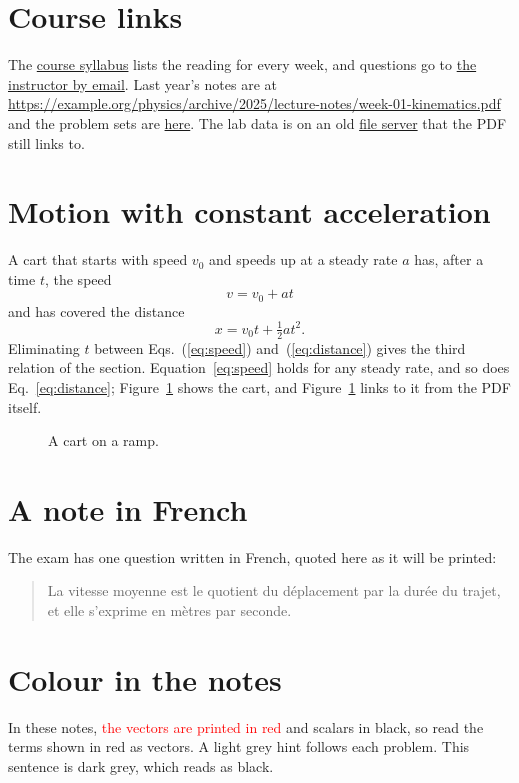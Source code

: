\documentclass[11pt]{article}
\begin{document}
\section{Course links}

The \href{https://example.org/physics/syllabus}{course syllabus} lists the reading for
every week, and questions go to
\href{mailto:instructor@example.edu}{the instructor by email}. Last year's notes are at
\url{https://example.org/physics/archive/2025/lecture-notes/week-01-kinematics.pdf} and
the problem sets are \href{https://example.org/physics/problems}{here}. The lab data is
on an old \href{ftp://ftp.example.org/lab/data.csv}{file server} that the PDF still
links to.

\section{Motion with constant acceleration}

A cart that starts with speed $v_0$ and speeds up at a steady rate $a$ has, after a time
$t$, the speed
\begin{equation}
  v = v_0 + a t
  \label{eq:speed}
\end{equation}
and has covered the distance
\begin{equation}
  x = v_0 t + \tfrac{1}{2} a t^2 .
  \label{eq:distance}
\end{equation}
Eliminating $t$ between Eqs.~(\ref*{eq:speed}) and~(\ref*{eq:distance}) gives the third
relation of the section. Equation~\eqref{eq:speed} holds for any steady rate, and so does
Eq.~\ref*{eq:distance}; Figure~\ref*{fig:cart} shows the cart, and
Figure~\ref{fig:cart} links to it from the PDF itself.

\begin{figure}[h]
  \centering
  \caption{A cart on a ramp.}
  \label{fig:cart}
\end{figure}

\section{A note in French}

The exam has one question written in French, quoted here as it will be printed:
\begin{quote}
La vitesse moyenne est le quotient du d\'eplacement par la dur\'ee du trajet, et elle
s'exprime en m\`etres par seconde.
\end{quote}

\section{Colour in the notes}

In these notes, \textcolor{red}{the vectors are printed in red} and scalars in black, so
read the terms shown in red as vectors. \textcolor{gray!35}{A light grey hint follows
each problem.} \textcolor{black!85}{This sentence is dark grey, which reads as black.}
\end{document}
